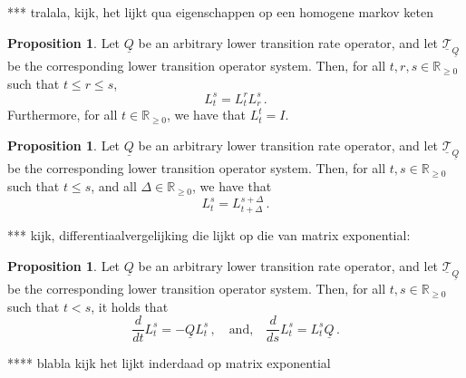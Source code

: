\documentclass[10pt]{paper}
\theoremstyle{definition}
\newtheorem{proposition}[theorem]{Proposition}
\newcommand{\reals}{\mathbb{R}}
\newcommand{\realsnonneg}{\reals_{\geq 0}}
\newcommand{\lbound}{L}
\newcommand{\lrate}{\underline{Q}}
\begin{document}
*** tralala, kijk, het lijkt qua eigenschappen op een homogene markov keten

\begin{proposition}\label{prop:lower_trans_system_is_system}
Let $\lrate$ be an arbitrary lower transition rate operator, and let $\underline{\mathcal{T}}_{\lrate}$ be the corresponding lower transition operator system. Then, for all $t,r,s\in\realsnonneg$ such that $t\leq r\leq s$,
\begin{equation*}
L_t^s = L_t^rL_r^s\,.
\end{equation*}
Furthermore, for all $t\in\realsnonneg$, we have that $L_t^t=I$.
\end{proposition}

\begin{proposition}\label{prop:lower_transition_is_homogeneous}
Let $\lrate$ be an arbitrary lower transition rate operator, and let $\underline{\mathcal{T}}_{\lrate}$ be the corresponding lower transition operator system. Then, for all $t,s\in\realsnonneg$ such that $t\leq s$, and all $\Delta\in\realsnonneg$, we have that
\begin{equation*}
L_t^s = L_{t+\Delta}^{s+\Delta}\,.
\end{equation*}
\end{proposition}

*** kijk, differentiaalvergelijking die lijkt op die van matrix exponential:

\begin{proposition}\label{prop:lower_transition_has_deriv}
Let $\lrate$ be an arbitrary lower transition rate operator, and let $\underline{\mathcal{T}}_{\lrate}$ be the corresponding lower transition operator system. Then, for all $t,s\in\realsnonneg$ such that $t<s$, it holds that
\begin{equation*}
\frac{d}{dt}\lbound_t^s=-\lrate\lbound_t^s\,,\quad\text{and,}\quad\frac{d}{ds}\lbound_t^s=\lbound_t^s\lrate\,.
\end{equation*}
\end{proposition}

**** blabla kijk het lijkt inderdaad op matrix exponential
\end{document}
